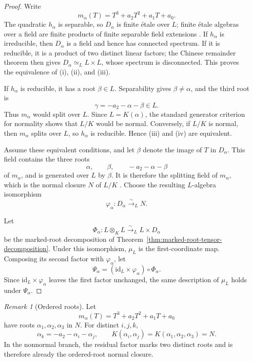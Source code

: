 \documentclass[11pt]{article}
\theoremstyle{remark}
\newtheorem*{remark}{Remark}
\newcommand{\id}{\mathrm{id}}
\begin{document}
\begin{proof}
Write
\[
  m_\alpha(T)=T^3+a_2T^2+a_1T+a_0.
\]
The quadratic \(h_\alpha\) is separable, so \(D_\alpha\) is finite
\'etale over \(L\); finite \'etale algebras over a field are finite
products of finite separable field extensions
\cite{StacksEtaleAlgebrasField}.
If \(h_\alpha\) is irreducible, then
\(D_\alpha\) is a field and hence has connected spectrum.  If it is
reducible, it is a product of two distinct linear factors; the Chinese
remainder theorem then gives \(D_\alpha\simeq_L L\times L\), whose spectrum
is disconnected.  This proves the equivalence of \textup{(i)},
\textup{(ii)}, and \textup{(iii)}.

If \(h_\alpha\) is reducible, it has a root \(\beta\in L\).
Separability gives \(\beta\neq\alpha\), and the third root is
\[
  \gamma=-a_2-\alpha-\beta\in L.
\]
Thus \(m_\alpha\) would split over \(L\).  Since
\(L=K(\alpha)\), the standard generator criterion for normality
\cite{StacksNormalGeneratorCriterion}
shows that \(L/K\) would be normal.  Conversely,
if \(L/K\) is normal, then \(m_\alpha\) splits over \(L\), so
\(h_\alpha\) is reducible.  Hence \textup{(iii)} and \textup{(iv)} are
equivalent.

Assume these equivalent conditions, and let \(\beta\) denote the image of
\(T\) in \(D_\alpha\).  This field contains the three roots
\[
  \alpha,\qquad \beta,\qquad -a_2-\alpha-\beta
\]
of \(m_\alpha\), and is generated over \(L\) by \(\beta\).  It is
therefore the splitting field of \(m_\alpha\), which is the normal
closure \(N\) of \(L/K\)
\cite{StacksNormalClosureExistence}.
Choose the resulting \(L\)-algebra
isomorphism
\[
  \varphi_\alpha\colon D_\alpha\xrightarrow{\sim}_L N.
\]

Let
\[
  \Phi_\alpha\colon
  L\otimes_KL
  \xrightarrow{\sim}_L
  L\times D_\alpha
\]
be the marked-root decomposition of
Theorem~\ref{thm:marked-root-tensor-decomposition}.  Under this
isomorphism, \(\mu_L\) is the first-coordinate map.
Composing its second factor with \(\varphi_\alpha\), let
\[
  \Psi_\alpha=(\id_L\times\varphi_\alpha)\circ\Phi_\alpha.
\]
Since \(\id_L\times\varphi_\alpha\) leaves the first factor unchanged,
the same description of \(\mu_L\) holds under \(\Psi_\alpha\).
\end{proof}

\begin{remark}[Ordered roots]
Let
\[
  m_\alpha(T)=T^3+a_2T^2+a_1T+a_0
\]
have roots \(\alpha_1,\alpha_2,\alpha_3\) in \(N\).  For distinct
\(i,j,k\),
\[
  \alpha_k=-a_2-\alpha_i-\alpha_j,
  \qquad
  K(\alpha_i,\alpha_j)
  =
  K(\alpha_1,\alpha_2,\alpha_3)
  =
  N.
\]
In the nonnormal branch, the residual factor marks two distinct roots
and is therefore already the ordered-root normal closure.
\end{remark}
\end{document}

